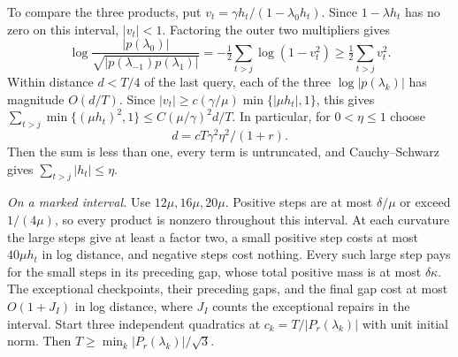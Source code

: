 \documentclass[11pt]{article}
\theoremstyle{definition}
\begin{document}
To compare the three products, put
\(v_t=\gamma h_t/(1-\lambda_0h_t)\). Since \(1-\lambda h_t\) has no
zero on this interval, \(|v_t|<1\). Factoring the outer two multipliers gives
\[
 \log\frac{|p(\lambda_0)|}
               {\sqrt{|p(\lambda_{-1})p(\lambda_1)|}}
 =-\tfrac12\sum_{t>j}\log(1-v_t^2)\ge\tfrac12\sum_{t>j}v_t^2 .
\]
Within distance \(d<T/4\) of the last query, each of the three
\(\log|p(\lambda_k)|\) has magnitude \(O(d/T)\). Since
\(|v_t|\ge c(\gamma/\mu)\min\{|\mu h_t|,1\}\), this gives
\(\sum_{t>j}\min\{(\mu h_t)^2,1\}\le C(\mu/\gamma)^2d/T\).
In particular, for \(0<\eta\le1\) choose
\begin{equation}\label{eq:three-radius}
 d=cT\gamma^2\eta^2/(1+r).
\end{equation}
Then the sum is less than one, every term is untruncated, and
Cauchy--Schwarz gives \(\sum_{t>j}|h_t|\le\eta\).

\emph{On a marked interval.} Use \(12\mu,16\mu,20\mu\). Positive steps
are at most \(\delta/\mu\) or exceed \(1/(4\mu)\), so every product
is nonzero throughout this interval. At each curvature the large
steps give at least a factor two, a small positive step costs at most
\(40\mu h_t\) in log distance, and negative steps cost nothing.
Every such large step pays for the small steps in its preceding gap, whose total positive mass is at most \(\delta\kappa\). The exceptional checkpoints, their preceding gaps, and the final gap cost at most \(O(1+J_I)\) in log distance, where \(J_I\) counts the exceptional repairs in the interval. Start three independent quadratics at \(c_k=T/|P_r(\lambda_k)|\)
with unit initial norm. Then \(T\ge\min_k|P_r(\lambda_k)|/\sqrt3\).
\end{document}
